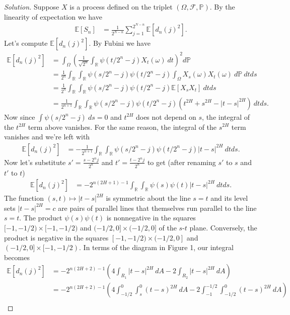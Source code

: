 \documentclass[11pt,letterpaper]{report}
\newcommand{\reals}{\mathbb{R}}
\newcommand{\mcal}[1]{\mathcal{#1}}
\newcommand{\E}{\mathbb{E}}
\newcommand{\Prob}{\mathbb{P}}
\newenvironment{solution}
{\begin{proof}[Solution]}
{\end{proof}}
\begin{document}
\begin{solution}
	Suppose $X$ is a process defined on the triplet $(\Omega, \mcal{F}, \Prob)$. By the linearity of expectation we have
	\begin{align*}
		\E[S_n] &= \frac{1}{2^{N-n}}\sum_{j=1}^{2^{N-n}}\E[d_n(j)^2].
	\end{align*}
	Let's compute $\E[d_n(j)^2]$. By Fubini we have
	\begin{align*}
		\E[d_n(j)^2] &= \int_\Omega\left(\frac{1}{\sqrt{2^n}}\int_\reals \psi(t/2^n-j)X_t(\omega)\ dt\right)^2d\Prob\\
		&= \frac{1}{2^n}\int_{\reals}\int_\reals\psi(s/2^n-j)\psi(t/2^n-j)\int_\Omega X_s(\omega)X_t(\omega)\ d\Prob\ dtds\\
		&= \frac{1}{2^n}\int_\reals\int_\reals\psi(s/2^n-j)\psi(t/2^n-j)\E[X_sX_t]\ dtds\\
		&= \frac{1}{2^{n+1}}\int_\reals\int_\reals\psi(s/2^n-j)\psi(t/2^n-j)(t^{2H} + s^{2H} - |t-s|^{2H})\ dtds.
	\end{align*}
	Now since $\int \psi(s/2^n - j)\ ds = 0$ and $t^{2H}$ does not depend on $s$, the integral of the $t^{2H}$ term above vanishes. For the same reason, the integral of the $s^{2H}$ term vanishes and we're left with
	\begin{align*}
		\E[d_n(j)^2] &= -\frac{1}{2^{n+1}}\int_\reals\int_\reals\psi(s/2^n-j)\psi(t/2^n-j)|t-s|^{2H}\ dtds.
	\end{align*}
	Now let's substitute $s' = \frac{s-2^nj}{2^n}$ and $t' = \frac{t-2^nj}{2^n}$ to get (after renaming $s'$ to $s$ and $t'$ to $t$)
	\begin{align*}
		\E[d_n(j)^2] &= -2^{n(2H+1)-1}\int_\reals\int_\reals\psi(s)\psi(t)|t-s|^{2H}\ dtds.
	\end{align*}
	The function $(s,t)\mapsto |t-s|^{2H}$ is symmetric about the line $s = t$ and its level sets $|t-s|^{2H} = c$ are pairs of parallel lines that themselves run parallel to the line $s = t$. The product $\psi(s)\psi(t)$ is nonnegative in the squares $[-1, -1/2) \times [-1, -1/2)$ and $(-1/2, 0]\times (-1/2, 0]$ of the $s$-$t$ plane. Conversely, the product is negative in the squares $[-1, -1/2)\times (-1/2, 0]$ and $(-1/2, 0]\times [-1, -1/2)$. In terms of the diagram in Figure 1, our integral becomes
	\begin{align*}
		\E[d_n(j)^2] &= -2^{n(2H+2) - 1}\left(4\int_{R_1}|t-s|^{2H}\ dA - 2\int_{R_2}|t-s|^{2H}\ dA \right)\\
		&= -2^{n(2H+2) - 1}\left(4\int_{-1/2}^0\int_s^0(t-s)^{2H}\ dA - 2\int_{-1}^{-1/2}\int_{-1/2}^0(t-s)^{2H}\ dA \right)\\

\end{align*}
\end{solution}
\end{document}
